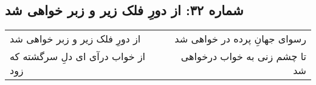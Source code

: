 \begin{center}
\section*{شماره ۳۲: از دورِ فلک زیر و زبر خواهی شد}
\label{sec:032}
\begin{longtable}{l p{0.5cm} r}
از دورِ فلک زیر و زبر خواهی شد
&&
رسوای جهانِ پرده در خواهی شد
\\
از خواب درآی ای دلِ سرگشته که زود
&&
تا چشم زنی به خواب درخواهی شد
\\
\end{longtable}
\end{center}
